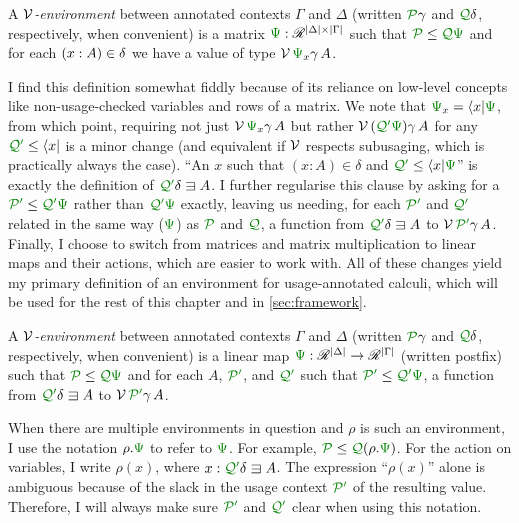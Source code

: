 \begin{definition}
  A \emph{$\mathcal V$-environment} between annotated contexts $\Gamma$ and $\Delta$
  (written $\grP\gamma$ and $\grQ\delta$, respectively, when convenient)
  is a matrix $\gr\Psi : \Ann^{\size\Delta \times \size\Gamma}$ such that
  $\grP \leq \grQ\gr\Psi$ and for each
  $\plr{x : A} \in \delta$ we have a value of type $\V\,\gr\Psi_x\gamma\,A$.
\end{definition}

I find this definition somewhat fiddly because of its reliance on low-level
concepts like non-usage-checked variables and rows of a matrix.
We note that $\gr\Psi_x = \bra x\gr\Psi$, from which point, requiring not
just $\V\,\gr\Psi_x\gamma\,A$ but rather $\V\,\plr{\grQprime\gr\Psi}\gamma\,A$
for any $\grQprime \leq \bra x$ is a minor change (and equivalent if $\mathcal V$
respects subusaging, which is practically always the case).
``An $x$ such that $(x : A) \in \delta$ and $\grQprime \leq \bra x\gr\Psi$''
is exactly the definition of $\grQprime\delta \sqni A$.
I further regularise this clause by asking for a
$\grPprime \leq \grQprime\gr\Psi$ rather than $\grQprime\gr\Psi$ exactly,
leaving us needing, for each $\grPprime$ and $\grQprime$ related in the same
way ($\gr\Psi$) as $\grP$ and $\grQ$, a function from $\grQprime\delta \sqni A$
to $\V\,\grPprime\gamma\,A$.
Finally, I choose to switch from matrices and matrix multiplication to
linear maps and their actions, which are easier to work with.
All of these changes yield my primary definition of an environment for
usage-annotated calculi, which will be used for the rest of this chapter and in
\cref{sec:framework}.

\begin{definition}\label{def:lr-env}
  A \emph{$\mathcal V$-environment} between annotated contexts $\Gamma$ and $\Delta$
  (written $\grP\gamma$ and $\grQ\delta$, respectively, when convenient)
  is a linear map $\gr\Psi : \Ann^{\size\Delta} \to \Ann^{\size\Gamma}$ (written
  postfix) such that $\grP \leq \grQ\gr\Psi$ and for each $A$, $\grPprime$, and
  $\grQprime$ such that $\grPprime \leq \grQprime\gr\Psi$, a function from
  $\grQprime\delta \sqni A$ to $\V\,\grPprime\gamma\,A$.

  When there are multiple environments in question and $\rho$ is such an
  environment, I use the notation $\rho.\gr\Psi$ to refer to $\gr\Psi$.
  For example, $\grP \leq \grQ\plr{\rho.\gr\Psi}$.
  For the action on variables, I write $\rho(x)$, where
  $x : \grQprime\delta \sqni A$.
  The expression ``$\rho(x)$'' alone is ambiguous because of the slack in the
  usage context $\grPprime$ of the resulting value.
  Therefore, I will always make sure $\grPprime$ and $\grQprime$ clear when
  using this notation.
\end{definition}

